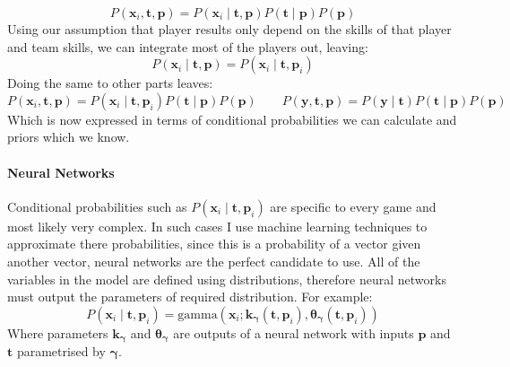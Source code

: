 \documentclass[12pt,a4paper]{book}
\newcommand\bs[1]{\boldsymbol{#1}}
\begin{document}
\begin{equation}
P(\bs{x}_i,\bs{t},\bs{p}) = P(\bs{x}_i\mid\bs{t},\bs{p})P(\bs{t}\mid\bs{p})P(\bs{p})
\end{equation}
Using our assumption that player results only depend on the skills of that player and team skills, we can integrate most of the players out, leaving:
\begin{equation}
P(\bs{x}_i\mid\bs{t},\bs{p}) = P(\bs{x}_i\mid\bs{t},\bs{p}_i)
\end{equation}
Doing the same to other parts leaves:
\begin{equation}
P(\bs{x}_i,\bs{t},\bs{p}) = P(\bs{x}_i\mid\bs{t},\bs{p}_i)P(\bs{t}\mid\bs{p})P(\bs{p})\qquad
P(\bs{y},\bs{t},\bs{p}) = P(\bs{y}\mid\bs{t})P(\bs{t}\mid\bs{p})P(\bs{p})
\label{eq:split-conditionals}
\end{equation}
Which is now expressed in terms of conditional probabilities we can calculate and priors which we know.

\paragraph{Neural Networks}
Conditional probabilities such as $P(\bs{x}_i\mid\bs{t},\bs{p}_i)$ are specific to every game and most likely very complex.
In such cases I use machine learning techniques to approximate there probabilities, since this is a probability of a vector given another vector, neural networks are the perfect candidate to use.
All of the variables in the model are defined using distributions, therefore neural networks must output the parameters of required distribution.
For example:
\begin{equation}
P(\bs{x}_i \mid\bs{t},\bs{p}_i)=\text{gamma}(\bs{x}_i;\bs{k_\gamma}(\bs{t},\bs{p}_i), \bs{\theta_\gamma}(\bs{t},\bs{p}_i))
\end{equation}
Where parameters $\bs{k_\gamma}$ and $\bs{\theta_\gamma}$ are outputs of a neural network with inputs $\bs{p}$ and $\bs{t}$ parametrised by $\bs{\gamma}$.
\end{document}
